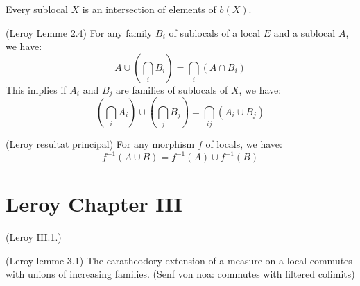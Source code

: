 \begin{lemma}
    Every sublocal $X$ is an intersection of elements of $b(X)$.
    \label{lem:b_X_generates_sublocals}
\end{lemma}


\begin{lemma}
(Leroy Lemme 2.4)
    \label{lem:union_of_intersections}
    For any family $B_i$ of sublocals of a local $E$ and a sublocal $A$, we have:
    \[A \cup (\bigcap_i B_i) = \bigcap_i (A \cap B_i)\]
    This implies if $A_i$ and $B_j$ are families of sublocals of $X$, we have:
    \[(\bigcap_i A_i)\cup(\bigcap_j B_j) =  \bigcap_{ij}(A_i \cup B_j)\]
\end{lemma}


\begin{theorem}
(Leroy resultat principal)
    \label{thm:preimage_commutes_with_unions}
    For any morphism $f$ of locals, we have:
    \[f^{-1}(A \cup B) = f^{-1}(A) \cup f^{-1}(B)\]
\end{theorem}


\chapter{Leroy Chapter III}\label{sec:leroy-chapter-iii}
\begin{definition}
    \label{def:measure_on_locals}
    (Leroy III.1.)
\end{definition}

\begin{definition}[Caratheodory]
    \label{def:caratheodory}
\end{definition}

\begin{lemma}
(Leroy lemme 3.1)
    \label{lem:commutes_with_sup}
    The caratheodory extension of a measure on a local commutes with unions of increasing families.
    (Senf von noa: commutes with filtered colimits)
\end{lemma}



\begin{definition}
    \label{def:regular_local}
\end{definition}



